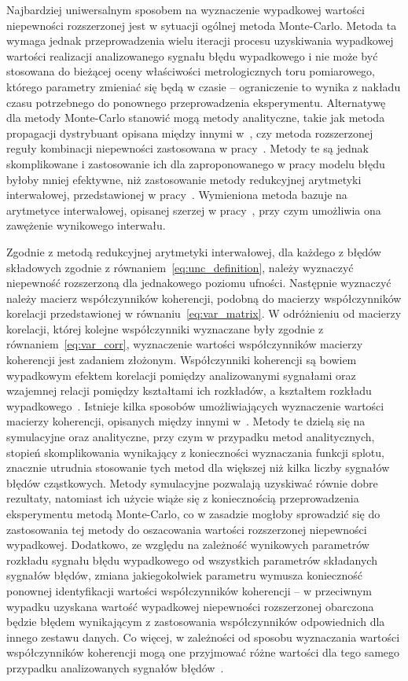 Najbardziej uniwersalnym sposobem na wyznaczenie wypadkowej wartości niepewności rozszerzonej jest w sytuacji ogólnej metoda Monte-Carlo. Metoda ta wymaga jednak przeprowadzenia wielu iteracji procesu uzyskiwania wypadkowej wartości realizacji analizowanego sygnału błędu wypadkowego i nie może być stosowana do bieżącej oceny właściwości metrologicznych toru pomiarowego, którego parametry zmieniać się będą w czasie -- ograniczenie to wynika z nakładu czasu potrzebnego do ponownego przeprowadzenia eksperymentu. Alternatywę dla metody Monte-Carlo stanowić mogą metody analityczne, takie jak metoda propagacji dystrybuant opisana między innymi w~\cite{zhang_pdp}, czy metoda rozszerzonej reguły kombinacji niepewności zastosowana w pracy~\cite{yang_euc}. Metody te są jednak skomplikowane i zastosowanie ich dla zaproponowanego w pracy modelu błędu byłoby mniej efektywne, niż zastosowanie metody redukcyjnej arytmetyki interwałowej, przedstawionej w pracy~\cite{jakubiec_redmono}. Wymieniona metoda bazuje na arytmetyce interwałowej, opisanej szerzej w pracy~\cite{moore_interval}, przy czym umożliwia ona zawężenie wynikowego interwału.

Zgodnie z metodą redukcyjnej arytmetyki interwałowej, dla każdego z błędów składowych zgodnie z równaniem~\eqref{eq:unc_definition}, należy wyznaczyć niepewność rozszerzoną dla jednakowego poziomu ufności. Następnie wyznaczyć należy macierz współczynników koherencji, podobną do macierzy współczynników korelacji przedstawionej w równaniu~\eqref{eq:var_matrix}. W odróżnieniu od macierzy korelacji, której kolejne współczynniki wyznaczane były zgodnie z równaniem~\eqref{eq:var_corr}, wyznaczenie wartości współczynników macierzy koherencji jest zadaniem złożonym. Współczynniki koherencji są bowiem wypadkowym efektem korelacji pomiędzy analizowanymi sygnałami oraz wzajemnej relacji pomiędzy kształtami ich rozkładów, a kształtem rozkładu wypadkowego~\cite{jakubiec_system}. Istnieje kilka sposobów umożliwiających wyznaczenie wartości macierzy koherencji, opisanych między innymi w~\cite{jakubiec_redmono, jakubiec_reductive, jakubiec_system, batko_uncertainty}. Metody te dzielą się na symulacyjne oraz analityczne, przy czym w przypadku metod analitycznych, stopień skomplikowania wynikający z konieczności wyznaczania funkcji splotu, znacznie utrudnia stosowanie tych metod dla większej niż kilka liczby sygnałów błędów cząstkowych. Metody symulacyjne pozwalają uzyskiwać równie dobre rezultaty, natomiast ich użycie wiąże się z koniecznością przeprowadzenia eksperymentu metodą Monte-Carlo, co w zasadzie mogłoby sprowadzić się do zastosowania tej metody do oszacowania wartości rozszerzonej niepewności wypadkowej. Dodatkowo, ze względu na zależność wynikowych parametrów rozkładu sygnału błędu wypadkowego od wszystkich parametrów składanych sygnałów błędów, zmiana jakiegokolwiek parametru wymusza konieczność ponownej identyfikacji wartości współczynników koherencji -- w przeciwnym wypadku uzyskana wartość wypadkowej niepewności rozszerzonej obarczona będzie błędem wynikającym z zastosowania współczynników odpowiednich dla innego zestawu danych. Co więcej, w zależności od sposobu wyznaczania wartości współczynników koherencji mogą one przyjmować różne wartości dla tego samego przypadku analizowanych sygnałów błędów~\cite{jakubiec_redmono}.

